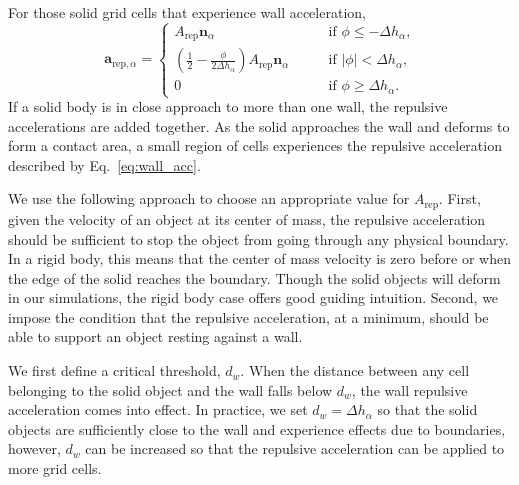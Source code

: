 \documentclass[times, 10pt]{article}
\renewcommand{\vec}[1]{\mathbf{#1}}
\newcommand{\nor}{\vec{n}}
\begin{document}
For those solid grid cells that experience wall acceleration,
\begin{equation}
  \mathbf a_{\text{rep}, \alpha} = \left\{
  \begin{array}{ll}
    A_\text{rep}  \nor_\alpha & \qquad \text{if $\phi\le-\Delta h_\alpha$,} \\
    \left ( \frac{1}{2}- \frac{\phi}{2\Delta h_\alpha} \right) A_\text{rep}  \nor_\alpha & \qquad \text{if $|\phi|<\Delta h_\alpha$,} \\
    0 & \qquad \text{if $\phi\ge\Delta h_\alpha$}.
  \end{array}
  \right.
  \label{eq:wall_acc}
\end{equation}
If a solid body is in close approach to more than one wall, the repulsive accelerations are added together.
As the solid approaches the wall and deforms to form a contact area, a small region of cells experiences the repulsive acceleration described by Eq.~\eqref{eq:wall_acc}.

We use the following approach to choose an appropriate value for $A_\text{rep}$.
First, given the velocity of an object at its center of mass, the repulsive acceleration should be sufficient to stop the object from going through any physical boundary.
In a rigid body, this means that the center of mass velocity is zero before or when the edge of the solid reaches the boundary.
Though the solid objects will deform in our simulations, the rigid body case offers good guiding intuition.
Second, we impose the condition that the repulsive acceleration, at a minimum, should be able to support an object resting against a wall.

We first define a critical threshold, $d_w$. When the distance between any cell belonging to the solid object and the wall falls below $d_w$, the wall repulsive acceleration comes into effect.
In practice, we set $d_w = \Delta h_\alpha$ so that the solid objects are sufficiently close to the wall and experience effects due to boundaries,
however, $d_w$ can be increased so that the repulsive acceleration can be applied to more grid cells.
\end{document}
